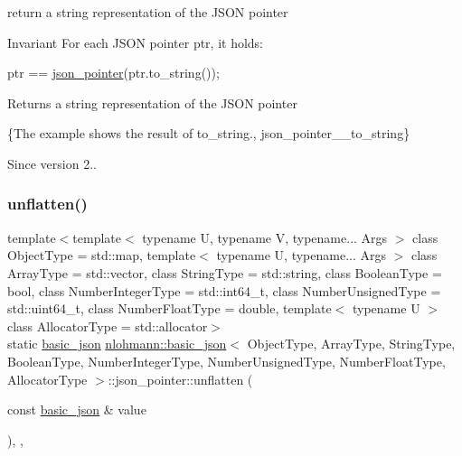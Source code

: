 return a string representation of the J\+S\+ON pointer 

\begin{DoxyInvariant}{Invariant}
For each J\+S\+ON pointer {\ttfamily ptr}, it holds\+: 
\begin{DoxyCode}
ptr == \hyperlink{classnlohmann_1_1basic__json_1_1json__pointer_ae12db117a2742d826465080979d7c835}{json\_pointer}(ptr.to\_string());
\end{DoxyCode}

\end{DoxyInvariant}
\begin{DoxyReturn}{Returns}
a string representation of the J\+S\+ON pointer
\end{DoxyReturn}
\{The example shows the result of {\ttfamily to\+\_\+string}., json\+\_\+pointer\+\_\+\+\_\+to\+\_\+string\}

\begin{DoxySince}{Since}
version 2.. 
\end{DoxySince}
\hypertarget{classnlohmann_1_1basic__json_1_1json__pointer_a16cb91da82183ec5e87d90b4599591b2}{}\label{classnlohmann_1_1basic__json_1_1json__pointer_a16cb91da82183ec5e87d90b4599591b2} 
\subsubsection{\texorpdfstring{unflatten()}{unflatten()}}
{\footnotesize\ttfamily template$<$template$<$ typename U, typename V, typename... Args $>$ class Object\+Type = std\+::map, template$<$ typename U, typename... Args $>$ class Array\+Type = std\+::vector, class String\+Type  = std\+::string, class Boolean\+Type  = bool, class Number\+Integer\+Type  = std\+::int64\+\_\+t, class Number\+Unsigned\+Type  = std\+::uint64\+\_\+t, class Number\+Float\+Type  = double, template$<$ typename U $>$ class Allocator\+Type = std\+::allocator$>$ \\
static \hyperlink{classnlohmann_1_1basic__json}{basic\+\_\+json} \hyperlink{classnlohmann_1_1basic__json}{nlohmann\+::basic\+\_\+json}$<$ Object\+Type, Array\+Type, String\+Type, Boolean\+Type, Number\+Integer\+Type, Number\+Unsigned\+Type, Number\+Float\+Type, Allocator\+Type $>$\+::json\+\_\+pointer\+::unflatten (\begin{DoxyParamCaption}\item[{const \hyperlink{classnlohmann_1_1basic__json}{basic\+\_\+json} \&}]{value }\end{DoxyParamCaption})\hspace{0.3cm}{\ttfamily [inline]}, {\ttfamily [static]}, {\ttfamily [private]}}


